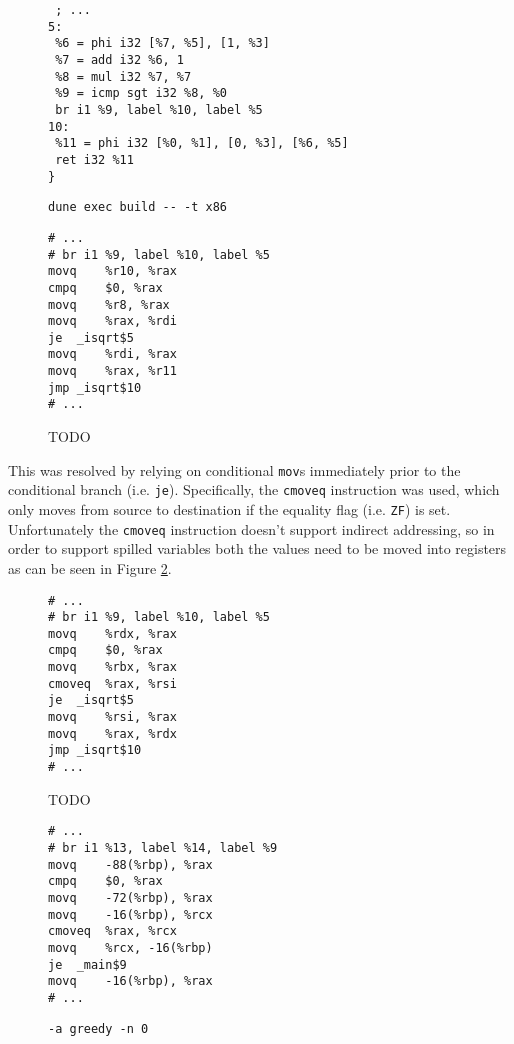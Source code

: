 \documentclass{article}
\begin{document}
\begin{figure}[H]
   \begin{minipage}{0.58\textwidth}
     \centering
     \begin{verbatim}
 ; ...
5:
 %6 = phi i32 [%7, %5], [1, %3]
 %7 = add i32 %6, 1
 %8 = mul i32 %7, %7
 %9 = icmp sgt i32 %8, %0
 br i1 %9, label %10, label %5
10:
 %11 = phi i32 [%0, %1], [0, %3], [%6, %5]
 ret i32 %11
}
     \end{verbatim}
     \caption{\texttt{dune exec build -{}- -t x86}}\label{fig:sqrt1.ll}
   \end{minipage}
   \begin{minipage}{0.40\textwidth}
     \centering
     \begin{verbatim}
# ...
# br i1 %9, label %10, label %5
movq	%r10, %rax
cmpq	$0, %rax
movq	%r8, %rax
movq	%rax, %rdi
je	_isqrt$5
movq	%rdi, %rax
movq	%rax, %r11
jmp	_isqrt$10
# ...
     \end{verbatim}
     \caption{TODO}\label{fig:sqrt1.s}
   \end{minipage}
\end{figure}

\noindent This was resolved by relying on conditional \texttt{mov}s immediately prior to the conditional branch (i.e. \texttt{je}). Specifically, the \texttt{cmoveq} instruction was used, which only moves from source to destination if the equality flag (i.e. \texttt{ZF}) is set.
Unfortunately the \texttt{cmoveq} instruction doesn't support indirect addressing, so in order to support spilled variables both the values need to be moved into registers as can be seen in Figure \ref{fig:fixed-ind-sqrt1.s}.



\begin{figure}[H]
   \begin{minipage}{0.48\textwidth}
     \centering
     \begin{verbatim}
# ...
# br i1 %9, label %10, label %5
movq	%rdx, %rax
cmpq	$0, %rax
movq	%rbx, %rax
cmoveq	%rax, %rsi
je	_isqrt$5
movq	%rsi, %rax
movq	%rax, %rdx
jmp	_isqrt$10
# ...
     \end{verbatim}
     \caption{TODO}\label{fig:fixed-sqrt1.s}
   \end{minipage}
   \begin{minipage}{0.48\textwidth}
     \centering
     \begin{verbatim}
# ...
# br i1 %13, label %14, label %9
movq	-88(%rbp), %rax
cmpq	$0, %rax
movq	-72(%rbp), %rax
movq	-16(%rbp), %rcx
cmoveq	%rax, %rcx
movq	%rcx, -16(%rbp)
je	_main$9
movq	-16(%rbp), %rax
# ...
     \end{verbatim}
     \caption{\texttt{-a greedy -n 0}}\label{fig:fixed-ind-sqrt1.s}
   \end{minipage}
\end{figure}
\end{document}

